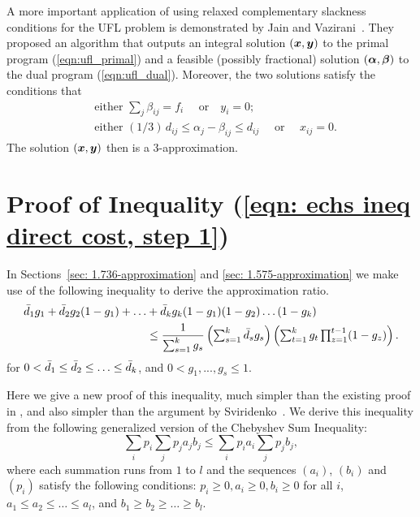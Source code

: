 \documentclass[oneside,final]{ucr}
\begin{document}
A more important application of using relaxed complementary
slackness conditions for the UFL problem is demonstrated by
Jain and Vazirani~\cite{JainV01}. They proposed an algorithm
that outputs an integral solution $(\boldsymbol{x}, \boldsymbol{y})$ to the
primal program (\ref{eqn:ufl_primal}) and a feasible
(possibly fractional) solution $(\boldsymbol{\alpha},\boldsymbol{\beta})$ to the
dual program (\ref{eqn:ufl_dual}). Moreover, the two
solutions satisfy the conditions that
\begin{align*}
  &\text{either } \sum_{j} \beta_{ij} = f_i  \quad \text{ or
} \quad y_i = 0;\\
  &\text{either } (1/3)\, d_{ij} \leq \alpha_j - \beta_{ij}
  \leq d_{ij} \quad \text{ or } \quad x_{ij} = 0.
\end{align*}
The solution $(\boldsymbol{x},\boldsymbol{y})$ then is a $3$-approximation.

\section{Proof of Inequality (\ref{eqn: echs ineq direct
    cost, step 1})}
\label{sec: ECHSinequality}

In Sections~\ref{sec: 1.736-approximation} and \ref{sec:
  1.575-approximation} we make use of the following
inequality to derive the approximation ratio.
%
\begin{align}
  \label{eq:min expected distance}
  {\bar d}_1 g_1 + {\bar d}_2 g_2 (1-g_1) +
  \ldots &+ {\bar d}_k g_k (1-g_1) (1-g_2) \ldots (1-g_k)\\ \notag
  &\leq \frac{1}{\sum_{s=1}^k g_s} \left(\textstyle\sum_{s=1}^k {\bar d}_s g_s\right)\left(\textstyle\sum_{t=1}^k g_t \textstyle\prod_{z=1}^{t-1} (1-g_z)\right).
\end{align}
%
for $0 < {\bar d}_1\leq {\bar d}_2 \leq \ldots \leq {\bar d}_k$, and
$0 < g_1,...,g_s \le 1$.

\medskip

Here we give a new proof of this inequality, much simpler
than the existing proof in \cite{ChudakS04}, and also
simpler than the argument by Sviridenko~\cite{Svi02}.  We
derive this inequality from the following generalized
version of the Chebyshev Sum Inequality:
%
\begin{equation}
  \label{eq:cheby}
  \textstyle{\sum_{i}} p_i \textstyle{\sum_j} p_j a_j b_j \leq \textstyle{\sum_i} p_i a_i \textstyle{\sum_j} p_j b_j,
\end{equation}
%
where each summation runs from $1$ to $l$ and the sequences
$(a_i)$, $(b_i)$ and $(p_i)$ satisfy the following
conditions: $p_i\geq 0, a_i \geq 0, b_i \geq 0$ for all $i$,
$a_1\leq a_2 \leq \ldots \leq a_l$, and $b_1 \geq b_2 \geq
\ldots \geq b_l$.
\end{document}
